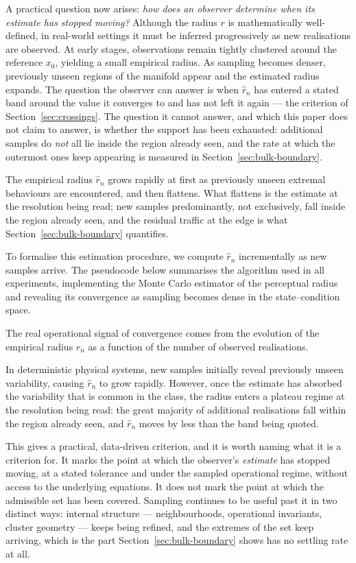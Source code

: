 \documentclass[10pt]{article}
\theoremstyle{plain}
\theoremstyle{definition}
\theoremstyle{remark}
\begin{document}
A practical question now arises: \emph{how does an observer determine when its
estimate has stopped moving?} Although the radius $r$ is mathematically
well-defined, in real-world settings it must be inferred progressively as new
realisations are observed. At early stages, observations remain tightly
clustered around the reference $x_0$, yielding a small empirical radius. As
sampling becomes denser, previously unseen regions of the manifold appear and
the estimated radius expands. The question the observer can answer is when
$\hat r_n$ has entered a stated band around the value it converges to and has
not left it again --- the criterion of Section~\ref{sec:crossings}. The question
it cannot answer, and which this paper does not claim to answer, is whether the
support has been exhausted: additional samples do \emph{not} all lie inside the
region already seen, and the rate at which the outermost ones keep appearing is
measured in Section~\ref{sec:bulk-boundary}.

The
empirical radius $\hat r_n$ grows rapidly at first as previously unseen extremal
behaviours are encountered, and then flattens. What flattens is the estimate at
the resolution being read; new samples predominantly, not exclusively, fall
inside the region already seen, and the residual traffic at the edge is what
Section~\ref{sec:bulk-boundary} quantifies.

To formalise this estimation procedure, we compute $\hat r_n$ incrementally as 
new samples arrive. The pseudocode below summarises the algorithm used in all 
experiments, implementing the Monte Carlo estimator of the perceptual radius 
and revealing its convergence as sampling becomes dense in the 
state--condition space.



The
real operational signal of convergence
comes from the evolution of the empirical radius $\hat r_n$ as a function of the
number of observed realisations. 

In deterministic physical systems, new samples initially reveal previously
unseen variability, causing $\hat r_n$ to grow rapidly. However, once the
estimate has absorbed the variability that is common in the class, the radius
enters a plateau regime at the resolution being read: the great majority of
additional realisations fall within the region already seen, and $\hat r_n$
moves by less than the band being quoted. 

This gives a practical, data-driven criterion, and it is worth naming what it
is a criterion for. It marks the point at which the observer's \emph{estimate}
has stopped moving, at a stated tolerance and under the sampled operational
regime, without access to the underlying equations. It does not mark the point
at which the admissible set has been covered. Sampling continues to be
useful past it in two distinct ways: internal structure --- neighbourhoods,
operational invariants, cluster geometry --- keeps being refined, and the
extremes of the set keep arriving, which is the part
Section~\ref{sec:bulk-boundary} shows has no settling rate at all.
\end{document}
